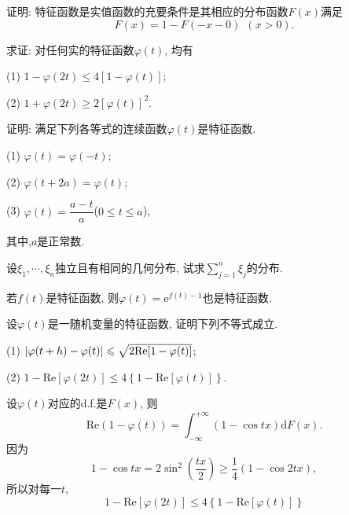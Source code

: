 \begin{yyEx}
	证明: 特征函数是实值函数的充要条件是其相应的分布函数$F(x)$满足\begin{equation}
		F(x) = 1 - F(- x - 0)~~(x>0).
	\end{equation}
\end{yyEx}

\begin{yyEx}
	求证: 对任何实的特征函数$\varphi(t)$, 均有
	\begin{blist}
		\item[(1)]$1-\varphi(2t)\leqslant 4\left[1-\varphi(t)\right]$;
		\item[(2)]$1+\varphi(2t)\geqslant 2\left[\varphi(t)\right]^2$.
	\end{blist}
\end{yyEx}

\begin{yyEx}
	证明: 满足下列各等式的连续函数$\varphi(t)$是特征函数.
	\begin{blist}
	\item[(1)]$\varphi(t) = \varphi(-t)$;
	\item[(2)]$\varphi(t+2a) = \varphi(t)$;
	\item[(3)]$\varphi(t) = \dfrac{a-t}{a}$($0\leqslant t\leqslant a$),
	\end{blist}
	其中,$a$是正常数.
\end{yyEx}

\begin{yyEx}
	设$\xi_1,\cdots,\xi_n$独立且有相同的几何分布, 试求$\sum\limits_{j=1}^n\xi_j$的分布.
\end{yyEx}

\begin{yyEx}
	若$f(t)$是特征函数, 则$\varphi(t) = \mathrm{e}^{f(t)-1}$也是特征函数.
\end{yyEx}

\begin{yyEx}
	设$\varphi(t)$是一随机变量的特征函数, 证明下列不等式成立.
	\begin{blist}
		\item[(1)]$\lvert\varphi(t+h) - \varphi(t)\rvert\leqslant \sqrt{2\mathrm{Re}[1-\varphi(t)]}$; 
		\item[(2)] $1-\mathrm{Re}[\varphi(2t)]\leqslant 4\left\{ 1 - \mathrm{Re}\left[\varphi(t)\right] \right\}$.
	\end{blist}
\end{yyEx}

\begin{yyProof}
	设$\varphi(t)$对应的d.f.是$F(x)$, 则
	\begin{equation}
		\mathrm{Re}(1-\varphi(t)) = \int_{-\infty}^{+\infty}(1-\cos tx)\mathrm{d}F(x).
	\end{equation}
	因为\begin{equation}
		1-\cos tx = 2\sin^2\left(\frac{tx}{2}\right) \geqslant \frac{1}{4} (1-\cos 2tx),
	\end{equation}
	所以对每一$t$, \begin{equation}
		1-\mathrm{Re}[\varphi(2t)]\leqslant 4\left\{ 1 - \mathrm{Re}\left[\varphi(t)\right] \right\}
	\end{equation}
\end{yyProof}

